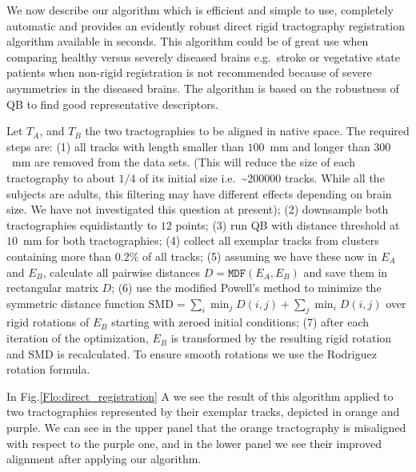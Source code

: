 \documentclass{bioinfo}
\begin{document}
We now describe our algorithm which is efficient and simple
to use, completely automatic and provides an evidently robust direct
rigid tractography registration algorithm available in seconds. This
algorithm could be of great use when comparing healthy versus severely
diseased brains e.g.~stroke or vegetative state patients when non-rigid
registration is not recommended because of severe asymmetries in the
diseased brains. The algorithm is based on the robustness of QB to find
good representative descriptors.

Let  $T_{A}$, and $T_{B}$ the two tractographies to be aligned
in native
space. The required steps are: (1) all tracks with length smaller than $100$~mm and longer than $300$~mm
are removed from the data sets. (This will reduce the size of each tractography
to about $1/4$ of its initial size i.e.~\textasciitilde \num{200000} tracks. While all
the subjects are adults, this filtering may have different effects
depending on brain size. We have not investigated this question at
present);
(2) downsample both tractographies equidistantly to $12$ points; 
(3) run QB with distance threshold at $10$~mm for both tractographies;
(4) collect all exemplar tracks from clusters containing more than $0.2\%$
of all tracks; (5) assuming we have these now in $E_{A}$ and $E_{B}$,
calculate all pairwise distances $D=\mathtt{MDF}(E_{A},E_{B})$ and
save them in rectangular matrix $D$;
(6) use the modified Powell's method \cite{fletcher1987practical} to minimize
the symmetric distance function $\mathrm{SMD}=\sum_{i}\min_{j}D(i,j)+\sum_{j}\min_{i}D(i,j)$ over rigid rotations of $E_{B}$ starting
with zeroed initial conditions; 
(7) after each iteration of the optimization,
$E_{B}$ is transformed by the resulting rigid rotation and $\mathrm{SMD}$
is recalculated. To ensure smooth rotations we use the Rodriguez
rotation formula.

In Fig.\ref{Flo:direct_registration} A we see the result of this
algorithm applied to two tractographies represented by their
exemplar tracks, depicted in orange and purple. We can see in the
upper panel that the orange tractography is misaligned with respect to
the purple one, and in the lower panel we see their improved alignment
after applying our algorithm.
\end{document}

